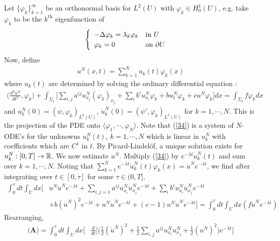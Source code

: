 \documentclass[12pt,a4paper]{report}
\newenvironment{proof}
{\begin{changemargin}{1cm}{0.5cm} 
	}%
	{\end{changemargin}
}
\begin{document}
\begin{proof}
\quad Let $\{\varphi_k \}_{k=1}^{\infty}$ be an orthonormal basis for $L^2(U)$ with $\varphi_k \in H_0^1(U)$, e.g. take $\varphi_k$ to be the $k^{\text{th}}$ eigenfunction of
\begin{align*}
\begin{cases}
\begin{array}{ll}
- \Delta \varphi_k = \lambda_k \varphi_k & \text{in } U \\
\varphi_k =0 & \text{on } \partial U
\end{array}
\end{cases}
\end{align*}
Now, define
\begin{align*}
u^N(x,t) = \sum_{k=1}^N u_k(t) \varphi_k(x)
\end{align*}
where $u_k(t)$ are determined by solving the ordinary differential equation :
\begin{align}
\Big( \frac{d^2 u^N}{dt^2}, \varphi_k \Big) + \int_{\Sigma_t} \Big[ \sum_{i,j} a^{ij}u_{x_j}^N (\varphi_k)_{x_j} + \sum_i b^i u_{x_i}^N \varphi_k + bu_t^N \varphi_k + cu^N \varphi_k \Big] dx = \int_{\Sigma_t} f\varphi_k dx \label{34}
\end{align}
and $u_k^N(0)= (\psi, \varphi_k)_{L^2(U)}$, $\dot{u}_k^N(0) = (\psi', \varphi_k)_{L^2(U)}$ for $k=1, \cdots, N$. This is the projection of the PDE onto $\langle \varphi_1, \cdots, \varphi_N \rangle$. Note that (\ref{34}) is a system of $N$-ODE's for the unknowns $u_k^N(t)$, $k=1, \cdots, N$ which is linear in $u_k^N$ with coefficients which are $C^1$ in $t$. By Picard-Lindel\"{o}f, a unique solution exists for $u_k^N:[0,T] \rightarrow \mathbb{R}$. We now estimate $u^N$. Multiply (\ref{34}) by $e^{-\lambda t} \dot{u}_k^N(t)$ and sum over $k=1, \cdots, N$. Noting that $\sum_{k=1}^N e^{-\lambda t} \dot{u}_k^N(t) \varphi_k(x) = \dot{u}^N e^{-\lambda t}$, we find after integrating over $t\in [0,\tau]$ for some $\tau \in (0,T]$,
\begin{align*}
\int_0^{\tau} dt \int_U dx \Big[ &\ddot{u}^N \dot{u}^N e^{-\lambda t} + \sum_{i,j=1} a^{ij}u_{x_i}^N \dot{u}_{x_j}^N e^{-\lambda t} + \sum_{i}b^i u_{x_i}^N \dot{u}_{x_j}^N e^{-\lambda t} \\
& + b(\dot{u}^{N})^2 e^{-\lambda t} + u^N \dot{u}^N e^{-\lambda t} + (c-1)u^N \dot{u}^N e^{-\lambda t} \Big] = \int_0^{\tau} dt \int_U dx (f\dot{u}^N e^{-\lambda t})
\end{align*}
Rearranging,
\begin{align*}
\textbf{(A)} = \int_0^{\tau} dt \int_U dx \bigg[ &\frac{d}{dt} \Big[ \Big( \frac{1}{2}(\dot{u}^N)^2 + \frac{1}{2} \sum_{i,j} a^{ij} u_{x_i}^N u_{x_j}^N + \frac{1}{2} (u^N)^2 \Big) e^{-\lambda t} \Big] \\

\end{align*}
\end{proof}
\end{document}
